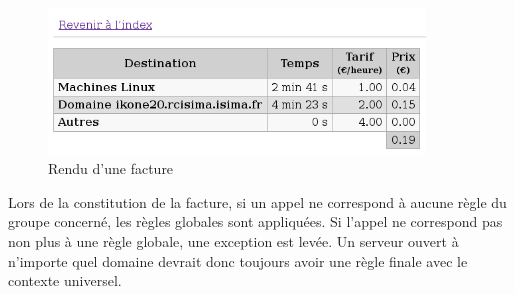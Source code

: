 \begin{figure}[H]
\begin{center}
\includegraphics[width=10cm]{images/facture.png}
\end{center}
\label{imgfacture}
\caption{Rendu d’une facture}
\end{figure}

Lors de la constitution de la facture, si un appel ne correspond à aucune règle du groupe concerné, les règles globales sont appliquées. Si l’appel ne correspond pas non plus à une règle globale, une exception est levée. Un serveur ouvert à n’importe quel domaine devrait donc toujours avoir une règle finale avec le contexte universel. 



